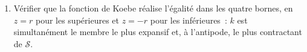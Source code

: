 \begin{problem}
\begin{enumerate}[resume]
{        segment $[0, z]$~; borne inférieure~: si $\abs{f(z)}
        < \frac14$, le segment $[0, f(z)]$ est dans
        $f(\mathbb D)$ par la question~7~; le ramener par
        $f^{-1}$ ---  par
        le~\cref{cor:b3:residues:openmapping} --- et borner
        $\abs{f(z)} = \int_\gamma\abs{f'(\zeta)}
        \,\abs{\dd\zeta} \geq \int_0^r\frac{1 - t}{(1 +
        t)^3}\,\dd t$, en utilisant $\abs{\dd\zeta} \geq
        \dd\abs\zeta$)}.
  \item Vérifier que la fonction de Koebe réalise l'égalité
        dans les quatre bornes, en $z = r$ pour les
        supérieures et $z = -r$ pour les inférieures~: $k$
        est simultanément le membre le plus expansif et, à
        l'antipode, le plus contractant de $\mathcal S$.
\end{enumerate}


\end{problem}
